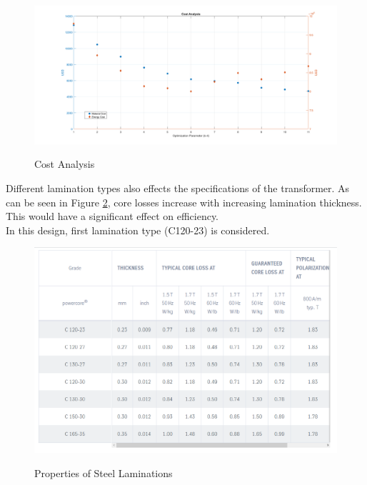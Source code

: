 \begin{figure}[H]
\hspace{1.5cm}
\centering\includegraphics[width=5.5in]{cost.PNG}\\
\caption{Cost Analysis}
\label{cost}
\end{figure} 

Different lamination types also effects the specifications of the transformer. As can be seen in Figure \ref{steel}, core losses increase with increasing lamination thickness. This would have a significant effect on efficiency.\\

In this design, first lamination type (C120-23) is considered. 

\begin{figure}[H]
\hspace{1.5cm}
\centering\includegraphics[width=4.5in]{steel_prop.PNG}\\
\caption{Properties of Steel Laminations}
\label{steel}
\end{figure} 
